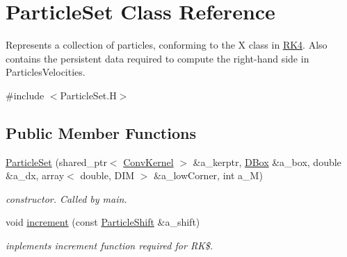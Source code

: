\hypertarget{class_particle_set}{}\section{Particle\+Set Class Reference}
\label{class_particle_set}


Represents a collection of particles, conforming to the X class in \hyperlink{class_r_k4}{R\+K4}. Also contains the persistent data required to compute the right-\/hand side in Particles\+Velocities.  




{\ttfamily \#include $<$Particle\+Set.\+H$>$}

\subsection*{Public Member Functions}
\begin{DoxyCompactItemize}
\item 
\hyperlink{class_particle_set_a3963fc6e57575ff7702b96fa2b5f1ccb}{Particle\+Set} (shared\+\_\+ptr$<$ \hyperlink{class_conv_kernel}{Conv\+Kernel} $>$ \&a\+\_\+kerptr, \hyperlink{class_d_box}{D\+Box} \&a\+\_\+box, double \&a\+\_\+dx, array$<$ double, D\+IM $>$ \&a\+\_\+low\+Corner, int a\+\_\+M)
\begin{DoxyCompactList}\small\item\em constructor. Called by main. \end{DoxyCompactList}\item 
\mbox{\label{class_particle_set_aa27ac22706a979dd57b6523254b27d83}} 
void \hyperlink{class_particle_set_aa27ac22706a979dd57b6523254b27d83}{increment} (const \hyperlink{class_particle_shift}{Particle\+Shift} \&a\+\_\+shift)
\begin{DoxyCompactList}\small\item\em inplements increment function required for RK\$. \end{DoxyCompactList}\end{DoxyCompactItemize}
